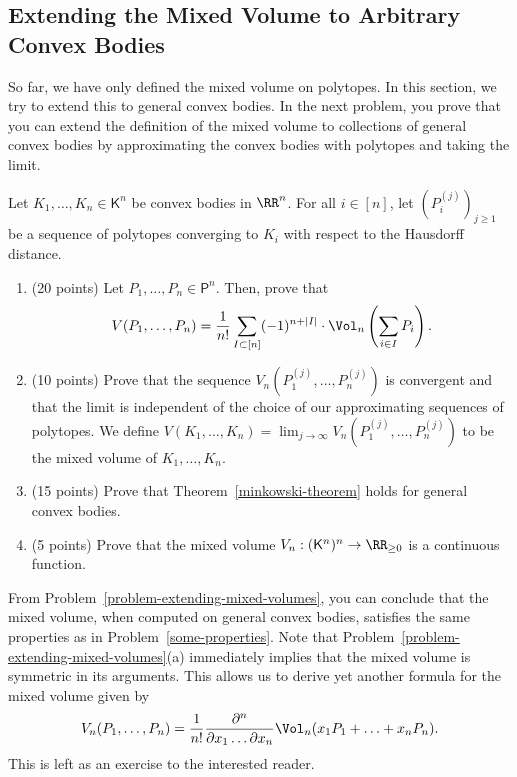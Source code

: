 \documentclass[11pt]{article}
\begin{document}
\subsection{Extending the Mixed Volume to Arbitrary Convex Bodies}

So far, we have only defined the mixed volume on polytopes. In this section, we try to extend this to general convex bodies. In the next problem, you prove that you can extend the definition of the mixed volume to collections of general convex bodies by approximating the convex bodies with polytopes and taking the limit.

\begin{prob} [50 points] \label{problem-extending-mixed-volumes}
    Let $K_1, \ldots, K_n \in \mathsf{K}^n$ be convex bodies in $\RR^n$. For all $i \in [n]$, let $(P_i^{(j)})_{j \geq 1}$ be a sequence of polytopes converging to $K_i$ with respect to the Hausdorff distance. 
    \begin{enumerate}[label = (\alph*)]
        \item (20 points) Let $P_1, \ldots, P_n \in \mathsf{P}^n$. Then, prove that 
        \[
            V(P_1, \ldots, P_n) = \frac{1}{n!} \sum_{I \subset [n]} (-1)^{n + |I|} \cdot \Vol_n \left ( \sum_{i \in I} P_i \right ).
        \]  
        \item (10 points) Prove that the sequence $V_n(P_1^{(j)}, \ldots, P_n^{(j)})$ is convergent and that the limit is independent of the choice of our approximating sequences of polytopes. We define $V(K_1, \ldots, K_n) = \lim_{j \to \infty} V_n(P_1^{(j)}, \ldots, P_n^{(j)})$ to be the mixed volume of $K_1, \ldots, K_n$. 
        
        \item (15 points) Prove that Theorem~\ref{minkowski-theorem} holds for general convex bodies. 
        
        \item (5 points) Prove that the mixed volume $V_n : (\mathsf{K}^n)^n \to \RR_{\geq 0}$ is a continuous function. 
    \end{enumerate}
\end{prob}

From Problem~\ref{problem-extending-mixed-volumes}, you can conclude that the mixed volume, when computed on general convex bodies, satisfies the same properties as in Problem~\ref{some-properties}. Note that Problem~\ref{problem-extending-mixed-volumes}(a) immediately implies that the mixed volume is symmetric in its arguments. This allows us to derive yet another formula for the mixed volume given by 
\[
    V_n(P_1, \ldots, P_n) = \frac{1}{n!} \frac{\partial^n}{\partial x_1 \ldots \partial x_n} \Vol_n(x_1 P_1 + \ldots + x_n P_n). 
\]
This is left as an exercise to the interested reader. 
\end{document}
